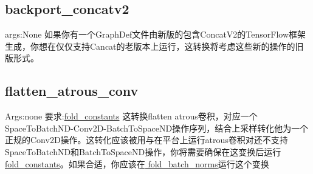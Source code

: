 \subsection{backport\_concatv2}
args:None
如果你有一个GraphDef文件由新版的包含ConcatV2的TensorFlow框架生成，你想在仅仅支持Cancat的老版本上运行，这转换将考虑这些新的操作的旧版形式。
\subsection{flatten\_atrous\_conv}
Args:none\newline
要求:\href{https://github.com/tensorflow/tensorflow/blob/r1.4/tensorflow/tools/graph_transforms/README.md#fold_constants}{fold\_constants}\newline
这转换flatten atrous卷积，对应一个SpaceToBatchND-Conv2D-BatchToSpaceND操作序列，结合上采样转化他为一个正规的Conv2D操作。这转化应该被用与在平台上运行atrous卷积对还不支持SpaceToBatchND和BatchToSpaceND操作，你将需要确保在这变换后运行\href{https://github.com/tensorflow/tensorflow/blob/r1.4/tensorflow/tools/graph_transforms/README.md#fold_constants}{fold\_constants}。如果合适，你应该在\href{https://github.com/tensorflow/tensorflow/blob/r1.4/tensorflow/tools/graph_transforms/README.md#fold_batch_norms}{ fold_batch_norms}运行这个变换













